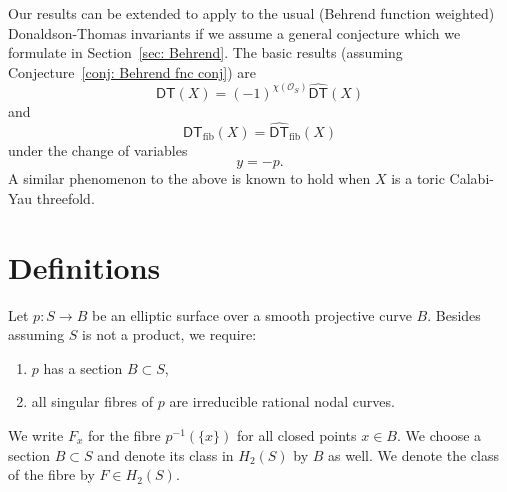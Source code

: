\documentclass{amsart}
\theoremstyle{definition}
\newcommand{\PP} {\mathbb{P}}
\renewcommand{\O}{\mathcal{O}}
\newcommand{\DT}{\mathsf{DT}}
\newcommand{\DThat}{\widehat{\DT}}
\newcommand{\fiber}{\mathrm{fib}}
\begin{document}
Our results can be extended to apply to the usual (Behrend function
weighted) Donaldson-Thomas invariants if we assume a general
conjecture which we formulate in Section~\ref{sec: Behrend}. The basic
results (assuming Conjecture~\ref{conj: Behrend fnc conj}) are
\[
\DT (X) = (-1)^{\chi (\O_{S})} \DThat (X)
\]
and
\[
\DT_{\fiber } (X) =  \DThat_{\fiber } (X)
\]
under the change of variables
\[
y=-p.
\]
A similar phenomenon to the above is known to hold when $X$ is a toric
Calabi-Yau threefold.


\section{Definitions}

Let $p : S \rightarrow B$ be an elliptic surface over a smooth
projective curve $B$. Besides assuming $S$ is not a product, we
require:
\begin{enumerate}
\item $p$ has a section $B \subset S$,
\item all singular fibres of $p$ are irreducible rational nodal curves. 
\end{enumerate}
We write $F_x$ for the fibre $p^{-1}(\{x\})$ for all closed points $x
\in B$. We choose a section $B \subset S$ and denote its class in
$H_2(S)$ by $B$ as well. We denote the class of the fibre by $F \in
H_2(S)$.

\end{document}
